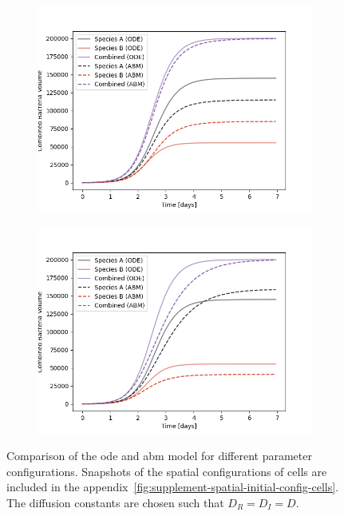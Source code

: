 \documentclass[10pt,A4paper]{article}
\numberwithin{equation}{section}
\begin{document}
\begin{figure}
    \begin{subfigure}[c]{0.5\columnwidth}
        \includegraphics[width=\columnwidth]{Figures/abm-inhomogenous/abm_ode_comparison.png}%
    \end{subfigure}%
    \begin{subfigure}[c]{0.5\columnwidth}
        \includegraphics[width=\columnwidth]{Figures/abm-random/abm_ode_comparison.png}%
    \end{subfigure}
    \caption{
        Comparison of the \ac{ode} and \ac{abm} model for different parameter configurations.
        Snapshots of the spatial configurations of cells are included in the appendix~\ref{fig:supplement-spatial-initial-config-cells}.
        The diffusion constants are chosen such that $D_R=D_I=D$.
    }
    \label{fig:spatial-growth-curve}
\end{figure}
%
%
\end{document}
